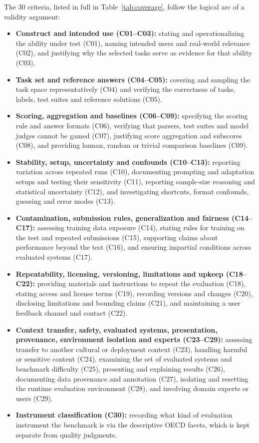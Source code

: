 \documentclass[10pt,conference]{IEEEtran}
\begin{document}
The 30 criteria, listed in full in Table~\ref{tab:coverage}, follow the logical arc of a validity argument:
\begin{itemize}
\item \textbf{Construct and intended use (C01--C03):} stating and operationalizing the ability under test (C01), naming intended users and real-world relevance (C02), and justifying why the selected tasks serve as evidence for that ability (C03).
\item \textbf{Task set and reference answers (C04--C05):} covering and sampling the task space representatively (C04) and verifying the correctness of tasks, labels, test suites and reference solutions (C05).
\item \textbf{Scoring, aggregation and baselines (C06--C09):} specifying the scoring rule and answer formats (C06), verifying that parsers, test suites and model judges cannot be gamed (C07), justifying score aggregation and subscores (C08), and providing human, random or trivial comparison baselines (C09).
\item \textbf{Stability, setup, uncertainty and confounds (C10--C13):} reporting variation across repeated runs (C10), documenting prompting and adaptation setups and testing their sensitivity (C11), reporting sample-size reasoning and statistical uncertainty (C12), and investigating shortcuts, format confounds, guessing and error modes (C13).
\item \textbf{Contamination, submission rules, generalization and fairness (C14--C17):} assessing training data exposure (C14), stating rules for training on the test and repeated submissions (C15), supporting claims about performance beyond the test (C16), and ensuring impartial conditions across evaluated systems (C17).
\item \textbf{Repeatability, licensing, versioning, limitations and upkeep (C18--C22):} providing materials and instructions to repeat the evaluation (C18), stating access and license terms (C19), recording versions and changes (C20), disclosing limitations and bounding claims (C21), and maintaining a user feedback channel and contact (C22).
\item \textbf{Context transfer, safety, evaluated systems, presentation, provenance, environment isolation and experts (C23--C29):} assessing transfer to another cultural or deployment context (C23), handling harmful or sensitive content (C24), examining the set of evaluated systems and benchmark difficulty (C25), presenting and explaining results (C26), documenting data provenance and annotation (C27), isolating and resetting the runtime evaluation environment (C28), and involving domain experts or users (C29).
\item \textbf{Instrument classification (C30):} recording what kind of evaluation instrument the benchmark is via the descriptive OECD facets, which is kept separate from quality judgments.
\end{itemize}
\end{document}
